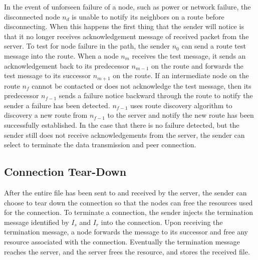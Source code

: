 In the event of unforseen failure of a node, such as power or network
failure, the disconnected node $n_d$ is unable to notify its neighbors on
a route before disconnecting. When this happens the first thing that the
sender will notice is that it no longer receives acknowledgement message
of received packet from the server. To test for node failure in the path,
the sender $n_0$ can send a route test message into the route. When a
node $n_m$ receives the test message, it sends an acknowledgement back to
its predecessor $n_{m-1}$ on the route and forwards the test message to
its successor $n_{m+1}$ on the route. If an intermediate node on the route
$n_f$ cannot be contacted or does not acknowledge the test message, then
its predecessor $n_{f-1}$ sends a failure notice backward through the route
to notify the sender a failure has been detected. $n_{f-1}$ uses route
discovery algorithm to discovery a new route from $n_{f-1}$ to the server
and notify the new route has been successfully established. In the case
that there is no failure detected, but the sender still does not receive
acknowledgements from the server, the sender can select to terminate the
data transmission and peer connection.

\subsection{Connection Tear-Down}

After the entire file has been sent to and received by the server, the
sender can choose to tear down the connection so that the nodes can free
the resources used for the connection. To terminate a connection, the
sender injects the termination message identified by $I_s$ and $I_r$ into
the connection. Upon receiving the termination message, a node forwards
the message to its successor and free any resource associated with the
connection. Eventually the termination message reaches the server, and the
server frees the resource, and stores the received file.
